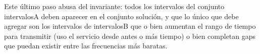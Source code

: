 %

Este \'ultimo paso abusa del invariante: todos los intervalos del conjunto intervalosA deben aparecer en el conjunto soluci\'on, y que lo \'unico que debe agregar son los intervalos de intervalosB que o bien aumentan el rango de tiempo para transmitir (uso el servicio desde antes o m\'as tiempo) o bien completan gaps que puedan existir entre las frecuencias m\'as baratas.




